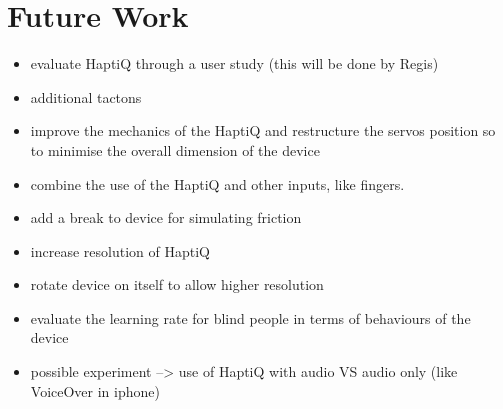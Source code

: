 \chapter{Future Work}
\label{chap:futureWork}

\begin{itemize}
	\item evaluate HaptiQ through a user study (this will be done by Regis)
	\item additional tactons
    \item improve the mechanics of the HaptiQ and restructure the servos position so to minimise the overall dimension of the device
    \item combine the use of the HaptiQ and other inputs, like fingers. 
    \item add a break to device for simulating friction
    \item increase resolution of HaptiQ
    \item rotate device on itself to allow higher resolution
\end{itemize}

\begin{itemize}
    \item evaluate the learning rate for blind people in terms of behaviours of the device
    \item possible experiment --> use of HaptiQ with audio VS audio only (like VoiceOver in iphone)
\end{itemize}